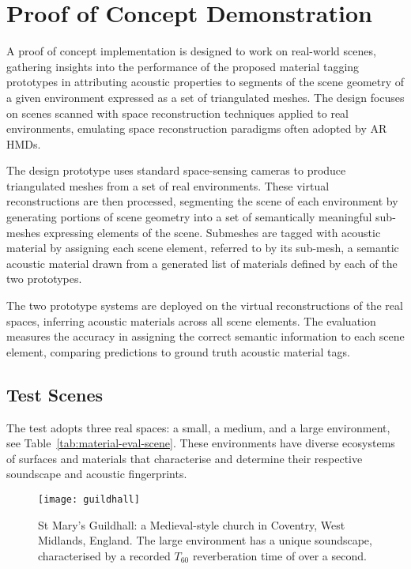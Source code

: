 \section{Proof of Concept Demonstration}
A proof of concept implementation is designed to work on real-world scenes, gathering insights into the performance of the proposed material tagging prototypes in attributing acoustic properties to segments of the scene geometry of a given environment expressed as a set of triangulated meshes. The design focuses on scenes scanned with space reconstruction techniques applied to real environments, emulating space reconstruction paradigms often adopted by AR HMDs. \par
The design prototype uses standard space-sensing cameras to produce triangulated meshes from a set of real environments. These virtual reconstructions are then processed, segmenting the scene of each environment by generating portions of scene geometry into a set of semantically meaningful sub-meshes expressing elements of the scene. Submeshes are tagged with acoustic material by assigning each scene element, referred to by its sub-mesh, a semantic acoustic material drawn from a generated list of materials defined by each of the two prototypes. \par
The two prototype systems are deployed on the virtual reconstructions of the real spaces, inferring acoustic materials across all scene elements. The evaluation measures the accuracy in assigning the correct semantic information to each scene element, comparing predictions to ground truth acoustic material tags.

\subsection{Test Scenes}
The test adopts three real spaces: a small, a medium, and a large environment, see Table~\ref{tab:material-eval-scene}. These environments have diverse ecosystems of surfaces and materials that characterise and determine their respective soundscape and acoustic fingerprints.

\begin{figure}[htbp]
    \centering
    \texttt{[image: guildhall]}
    \caption{St Mary's Guildhall: a Medieval-style church in Coventry, West Midlands, England. The large environment has a unique soundscape, characterised by a recorded $T_{60}$ reverberation time of over a second.}
    \label{fig:guildhall-iso-render}
\end{figure}

